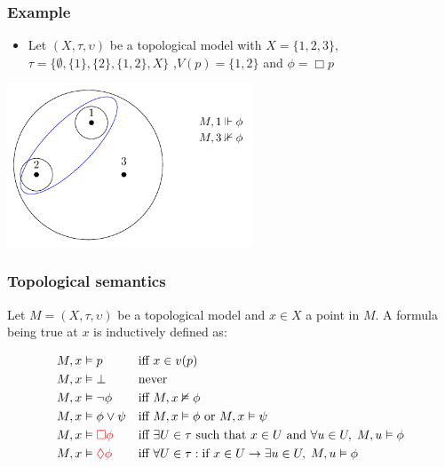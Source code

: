 \documentclass[hyperref={pdfpagelabels=false},t,10pt]{beamer}
\begin{document}
  \begin{frame}
  
    \frametitle{Example}
    \begin{itemize}
      \item  Let $(X,\tau, \upsilon)$ be a topological model with 
      $X = \{1,2,3\}$, $\tau = \{\emptyset, \{1\}, \{2\}, \{1,2\}, X\}$ ,$V(p) = \{1,2\}$  and $\phi = \Box p$
      \pause
    \end{itemize}
    \centering
    \includegraphics[width=0.55\textwidth]{Example2.pdf}

  \end{frame}


\begin{frame}
  \frametitle{Topological semantics}
  \begin{definition}
  Let $M = (X, \tau, \upsilon)$ be a topological model and $x \in X$ a point in $M$. A formula being true at $x$ is inductively defined as:

  \[
\begin{aligned}
    M, x &\vDash p &&\text{iff } x \in v(p) \\
    M, x &\vDash \bot &&\text{never} \\
    M, x &\vDash \neg \phi &&\text{iff } M, x \nvDash \phi \\
    M, x &\vDash \phi \lor \psi &&\text{iff } M, x \vDash \phi \text{ or } M, x \vDash \psi \\
    M, x &\vDash \textcolor{red}{\Box \phi} &&\text{iff }\exists U \in \tau \text{ such that } x \in U \text{ and } \forall u \in U,\; M, u \vDash \phi \\
    M, x &\vDash \textcolor{red}{\lozenge \phi} &&\text{iff }\forall U \in \tau: \text{if }x \in U \rightarrow \exists u \in U,\; M, u \vDash \phi
  \end{aligned}
\]
\end{definition}
\end{frame}
\end{document}
